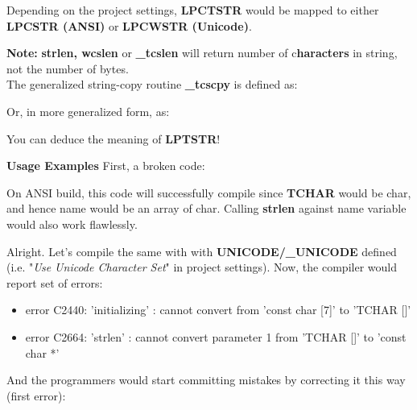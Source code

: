 	Depending on the project settings, \textbf{LPCTSTR} would be mapped to either \textbf{LPCSTR (ANSI)} or \textbf{LPCWSTR (Unicode)}.
	
	\textbf{Note:} \textbf{strlen, wcslen} or \textbf{\_tcslen} will return number of c\textbf{haracters} in string, not the number of bytes.\\
	
	The generalized string-copy routine \textbf{\_tcscpy} is defined as:\\
	
	
	Or, in more generalized form, as:\\
	
	
	You can deduce the meaning of \textbf{LPTSTR}!
	
	\textbf{Usage Examples}
	First, a broken code:
	
	
	On ANSI build, this code will successfully compile since \textbf{TCHAR} would be char, and hence name would be an array of char. Calling \textbf{strlen} against name variable would also work flawlessly.
	
	Alright. Let's compile the same with with \textbf{UNICODE/\_UNICODE} defined (i.e. "\textit{Use Unicode Character Set}" in project settings). Now, the compiler would report set of errors:
	
	\begin{itemize}
		\item error C2440: 'initializing' : cannot convert from 'const char [7]' to 'TCHAR []'
		\item error C2664: 'strlen' : cannot convert parameter 1 from 'TCHAR []' to 'const char *'
	\end{itemize}
	
	
	And the programmers would start committing mistakes by correcting it this way (first error):\\
	
	
